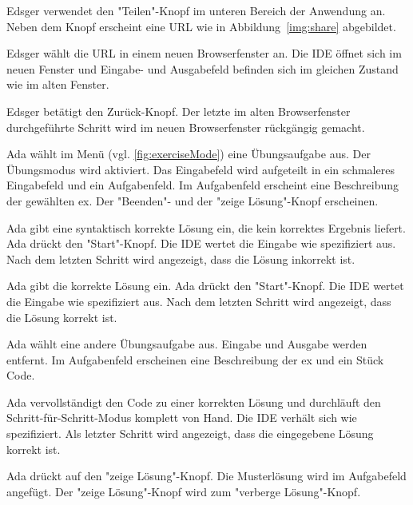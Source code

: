\documentclass[parskip=full,11pt,twoside]{scrartcl}
\begin{document}
{Edsger verwendet den "Teilen"-Knopf im unteren Bereich der Anwendung an.}
{Neben dem Knopf erscheint eine URL wie in Abbildung~\ref{img:share}
abgebildet.}

{Edsger wählt die URL in einem neuen Browserfenster an.}
{Die IDE öffnet sich im neuen Fenster und Eingabe- und Ausgabefeld befinden sich im gleichen Zustand wie im alten Fenster.}

{Edsger betätigt den Zurück-Knopf.}
{Der letzte im alten Browserfenster durchgeführte Schritt wird im neuen Browserfenster
rückgängig gemacht.}


{Ada wählt im Menü (vgl. \cref{fig:exerciseMode}) eine Übungsaufgabe aus.}
{Der Übungsmodus wird aktiviert. 
 Das Eingabefeld wird aufgeteilt in ein schmaleres Eingabefeld und ein Aufgabenfeld.
 Im Aufgabenfeld erscheint eine Beschreibung der gewählten \gls{ex}.
 Der "Beenden"- und der "zeige Lösung"-Knopf erscheinen.}

{Ada gibt eine syntaktisch korrekte Lösung ein, die kein korrektes Ergebnis liefert.
 Ada drückt den "Start"-Knopf.}
{Die IDE wertet die Eingabe wie spezifiziert aus.
 Nach dem letzten Schritt wird angezeigt, dass die Lösung inkorrekt ist.}

{Ada gibt die korrekte Lösung ein. Ada drückt den "Start"-Knopf.}
{Die IDE wertet die Eingabe wie spezifiziert aus.
 Nach dem letzten Schritt wird angezeigt, dass die Lösung korrekt ist.}
 
{Ada wählt eine andere Übungsaufgabe aus.}
{Eingabe und Ausgabe werden entfernt.
Im Aufgabenfeld erscheinen eine Beschreibung der \gls{ex} und ein Stück Code.}

{Ada vervollständigt den Code zu einer korrekten Lösung und durchläuft den Schritt-für-Schritt-Modus komplett von Hand.}
{Die IDE verhält sich wie spezifiziert.
 Als letzter Schritt wird angezeigt, dass die eingegebene Lösung korrekt ist.}

{Ada drückt auf den "zeige Lösung"-Knopf.}
{Die Musterlösung wird im Aufgabefeld angefügt.
 Der "zeige Lösung"-Knopf wird zum "verberge Lösung"-Knopf.}
\end{document}
